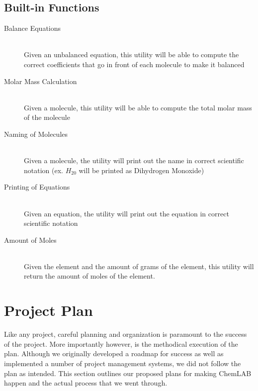 \documentclass[11pt]{report}
\begin{document}
\section{Built-in Functions}
\begin{description}
	\item[Balance Equations] \hfill \\
	Given an unbalanced equation, this utility will be able to compute the correct coefficients that go in front of each molecule to make it balanced

	\item[Molar Mass Calculation] \hfill \\
	Given a molecule, this utility will be able to compute the total molar mass of the molecule

	\item[Naming of Molecules] \hfill \\
	Given a molecule, the utility will print out the name in correct scientific notation (ex. $H_20$ will be printed as Dihydrogen Monoxide) 

	\item[Printing of Equations] \hfill \\
	Given an equation, the utility will print out the equation in correct scientific notation 

	\item[Amount of Moles] \hfill \\
	Given the element and the amount of grams of the element, this utility will return the amount of moles of the element.
\end{description}

\chapter{Project Plan}
Like any project, careful planning and organization is paramount to the success of the project. More importantly however, is the methodical execution of the plan. Although we originally developed a roadmap for success as well as implemented a number of project management systems, we did not follow the plan as intended. This section outlines our proposed plans for making ChemLAB happen and the actual process that we went through. 
\end{document}
